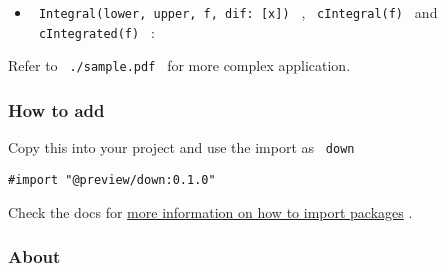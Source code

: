 \begin{Shaded}
\begin{Highlighting}[]
\NormalTok{$}
\NormalTok{$}
\end{Highlighting}
\end{Shaded}

\begin{itemize}
\tightlist
\item
  \texttt{\ Integral(lower,\ upper,\ f,\ dif:\ {[}x{]})\ } ,
  \texttt{\ cIntegral(f)\ } and \texttt{\ cIntegrated(f)\ } :
\end{itemize}

\begin{Shaded}
\begin{Highlighting}[]
\NormalTok{$}
\NormalTok{$}
\end{Highlighting}
\end{Shaded}

Refer to \texttt{\ ./sample.pdf\ } for more complex application.

\subsubsection{How to add}\label{how-to-add}

Copy this into your project and use the import as \texttt{\ down\ }

\begin{verbatim}
#import "@preview/down:0.1.0"
\end{verbatim}



Check the docs for
\href{https://typst.app/docs/reference/scripting/\#packages}{more
information on how to import packages} .

\subsubsection{About}\label{about}


